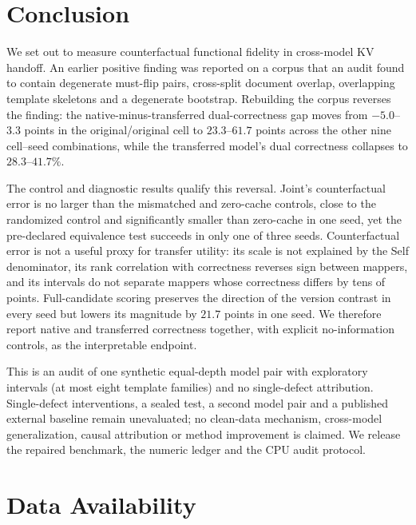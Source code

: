 \documentclass[11pt,twocolumn]{article}
\begin{document}
\section{Conclusion}
\label{sec:conclusion}

We set out to measure counterfactual functional fidelity in cross-model KV
handoff. An earlier positive finding was reported on a corpus that an audit
found to contain degenerate must-flip pairs, cross-split document overlap,
overlapping template skeletons and a degenerate bootstrap. Rebuilding the
corpus reverses the finding: the native-minus-transferred dual-correctness gap
moves from $-5.0$--$3.3$ points in the original/original cell to
$23.3$--$61.7$ points across the other nine cell--seed combinations, while the
transferred model's dual correctness collapses to $28.3$--$41.7\%$.

The control and diagnostic results qualify this reversal. Joint's
counterfactual error is no larger than the mismatched and zero-cache controls,
close to the randomized control and significantly smaller than zero-cache in one
seed, yet the pre-declared
equivalence test succeeds in only one of three seeds. Counterfactual error is
not a useful proxy for transfer utility: its scale is not explained by the
Self denominator, its rank correlation with correctness reverses sign between
mappers, and its intervals do not separate mappers whose correctness differs by
tens of points. Full-candidate scoring preserves the direction of the version
contrast in every seed but lowers its magnitude by $21.7$ points in one seed.
We therefore report native and transferred correctness together, with explicit
no-information controls, as the interpretable endpoint.

This is an audit of one synthetic equal-depth model pair with exploratory
intervals (at most eight template families) and no single-defect attribution.
Single-defect interventions, a sealed test, a second model pair and a published
external baseline remain unevaluated; no clean-data mechanism, cross-model
generalization, causal attribution or method improvement is claimed. We release
the repaired benchmark, the numeric ledger and the CPU audit protocol.

\section*{Data Availability}
\label{sec:dataavail}
\end{document}
